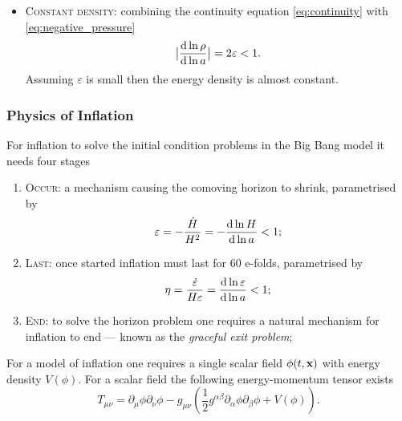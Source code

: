 \begin{itemize}
	\item \textsc{Constant density}:
	      combining the continuity equation \cref{eq:continuity} with \cref{eq:negative_pressure}
	      \begin{equation}
		      \big\lvert\frac{\dd{\ln{\rho}}}{\dd{\ln{a}}}\big\rvert
		      = 2\varepsilon
		      < 1.
	      \end{equation}
	      Assuming \({\varepsilon}\) is small then the energy density is almost constant.
\end{itemize}

\subsubsection{Physics of Inflation}

For inflation to solve the initial condition problems in the Big Bang model it needs four stages
%
\begin{enumerate}
	\item \textsc{Occur}:
	      a mechanism causing the comoving horizon to shrink, parametrised by
	      \begin{equation}
		      \varepsilon
		      = -\frac{\dot{H}}{H^{2}}
		      = -\dv{\ln{H}}{\ln{a}}
		      < 1;
	      \end{equation}

	\item \textsc{Last}:
	      once started inflation must last for 60 e-folds, parametrised by
	      \begin{equation}
		      \eta
		      = \frac{\dot{\varepsilon}}{H\varepsilon}
		      = \dv{\ln{\varepsilon}}{\ln{a}}
		      < 1;
	      \end{equation}

	\item \textsc{End}:
	      to solve the horizon problem one requires a natural mechanism for inflation to end --- known as the \emph{graceful exit problem};
\end{enumerate}
%
For a model of inflation one requires a single scalar field \(\phi(t,\vb{x})\) with energy density \(V(\phi)\).
For a scalar field the following energy-momentum tensor exists
%
\begin{equation}
	T_{\mu\nu}
	= \partial_{\mu}\phi \partial_{\nu}\phi - g_{\mu\nu}\left( \frac{1}{2}g^{\alpha\beta} \partial_{\alpha}\phi \partial_{\beta}\phi + V(\phi) \right).
\end{equation}
